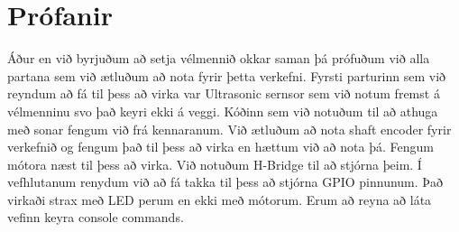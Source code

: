 \section{Prófanir}
Áður en við byrjuðum að setja vélmennið okkar saman þá prófuðum við alla partana sem við ætluðum að nota fyrir þetta verkefni. Fyrsti parturinn sem við reyndum að fá til þess að virka var Ultrasonic sernsor sem við notum fremst á vélmenninu svo það keyri ekki á veggi. Kóðinn sem við notuðum til að athuga með sonar fengum við frá kennaranum. Við ætluðum að nota shaft encoder fyrir verkefnið og fengum það til þess að virka en hættum við að nota þá. Fengum mótora næst til þess að virka. Við notuðum H-Bridge til að stjórna þeim. Í vefhlutanum renydum við að fá takka til þess að stjórna GPIO pinnunum. Það virkaði strax með LED perum en ekki með mótorum. Erum að reyna að láta vefinn keyra console commands.  \cite{pi2015raspberry}
